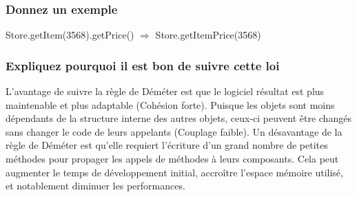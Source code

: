 \subsubsection{Donnez un exemple}
\textcolor[rgb]{0,0.48,0.58}{Store.getItem(3568).getPrice() $\Rightarrow$ Store.getItemPrice(3568)}

\subsubsection{Expliquez pourquoi il est bon de suivre cette loi}
\textcolor[rgb]{0,0.48,0.58}{L'avantage de suivre la règle de Déméter est que le logiciel résultat est plus maintenable et plus adaptable (Cohésion forte). Puisque les objets sont moins dépendants de la structure interne des autres objets, ceux-ci peuvent être changés sans changer le code de leurs appelants (Couplage faible). Un désavantage de la règle de Déméter est qu'elle requiert l'écriture d'un grand nombre de petites méthodes pour propager les appels de méthodes à leurs composants. Cela peut augmenter le temps de développement initial, accroître l'espace mémoire utilisé, et notablement diminuer les performances.}